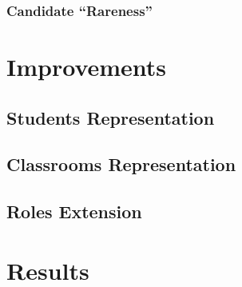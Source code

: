 \documentclass{beamer}
\begin{document}
\subsubsection{Candidate ``Rareness''}

\section{Improvements}
\subsection{Students Representation}
\subsection{Classrooms Representation}
\subsection{Roles Extension}

\section{Results}
\end{document}

